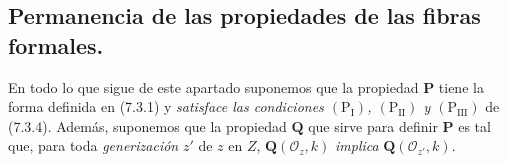 \subsection{Permanencia de las propiedades de las fibras formales.}
\label{subsection:IV.7.4-fr}

\begin{env}[7.4.1]
\label{IV.2.s7.4.1-fr}
En todo lo que sigue de este apartado suponemos que la propiedad
$\boldsymbol P$ tiene la forma definida en (7.3.1) y \emph{satisface
las condiciones $(\mathrm P_{\mathrm I})$, $(\mathrm P_{\mathrm{II}})$
y $(\mathrm P_{\mathrm{III}})$} de (7.3.4). Además, suponemos que la
propiedad $\boldsymbol Q$ que sirve para definir $\boldsymbol P$ es
tal que, para toda \emph{generización} $z'$ de $z$ en $Z$,
$\boldsymbol Q(\mathscr O_z,k)$ \emph{implica}
$\boldsymbol Q(\mathscr O_{z'},k)$.
\end{env}
